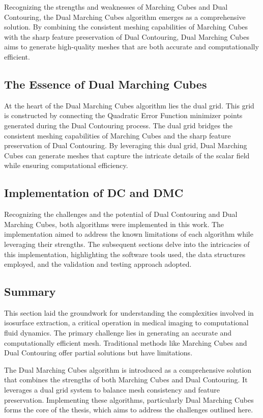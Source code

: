 Recognizing the strengths and weaknesses of Marching Cubes and Dual Contouring, the Dual Marching Cubes algorithm emerges as a comprehensive solution. By combining the consistent meshing capabilities of Marching Cubes with the sharp feature preservation of Dual Contouring, Dual Marching Cubes aims to generate high-quality meshes that are both accurate and computationally efficient.

\subsection{The Essence of Dual Marching Cubes}

At the heart of the Dual Marching Cubes algorithm lies the dual grid. This grid is constructed by connecting the Quadratic Error Function minimizer points generated during the Dual Contouring process. The dual grid bridges the consistent meshing capabilities of Marching Cubes and the sharp feature preservation of Dual Contouring. By leveraging this dual grid, Dual Marching Cubes can generate meshes that capture the intricate details of the scalar field while ensuring computational efficiency.

\subsection{Implementation of DC and DMC} 

Recognizing the challenges and the potential of Dual Contouring and Dual Marching Cubes, both algorithms were implemented in this work. The implementation aimed to address the known limitations of each algorithm while leveraging their strengths. The subsequent sections delve into the intricacies of this implementation, highlighting the software tools used, the data structures employed, and the validation and testing approach adopted.

\subsection{Summary}

This section laid the groundwork for understanding the complexities involved in isosurface extraction, a critical operation in medical imaging to computational fluid dynamics. The primary challenge lies in generating an accurate and computationally efficient mesh. Traditional methods like Marching Cubes and Dual Contouring offer partial solutions but have limitations.

The Dual Marching Cubes algorithm is introduced as a comprehensive solution that combines the strengths of both Marching Cubes and Dual Contouring. It leverages a dual grid system to balance mesh consistency and feature preservation. Implementing these algorithms, particularly Dual Marching Cubes forms the core of the thesis, which aims to address the challenges outlined here.

